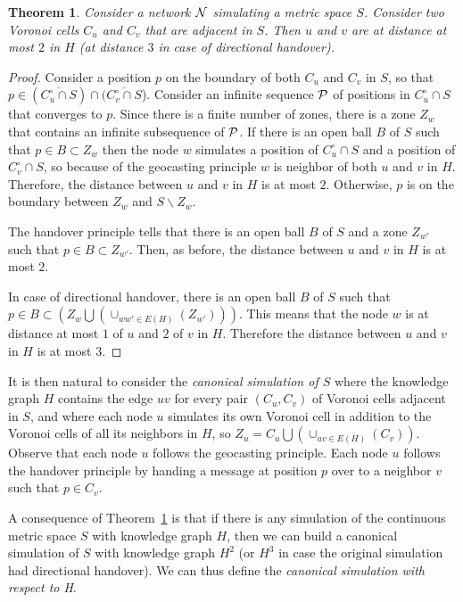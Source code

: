 \documentclass{article}
\newtheorem{theorem}{Theorem}
\begin{document}
\begin{theorem}
Consider a network $\cal N$ simulating a metric space $S$. Consider two Voronoi cells $C_u$ and $C_v$ that are adjacent in $S$. Then $u$ and $v$ are at distance at most $2$ in $H$ (at distance $3$ in case of directional handover).
\label{th_voronoi}
\end{theorem}

\begin{proof}
Consider a position $p$ on the boundary of both $C_u$ and $C_v$ in $S$, so that $p\in(\overline{C_u^\circ\cap S})\cap(\overline{C_v^\circ\cap S}$). Consider an infinite sequence $\cal P$ of positions in $C_u^\circ\cap S$ that converges to $p$. Since there is a finite number of zones, there is a zone $Z_w$ that contains an infinite subsequence of $\cal P$. 
If there is an open ball $B$ of $S$ such that $p\in B\subset Z_w$ then the node $w$ simulates a position of $C_u^\circ\cap S$ and a position of $C_v^\circ\cap S$, so because of the geocasting principle $w$ is neighbor of both $u$ and $v$ in $H$. Therefore, the distance between $u$ and $v$ in $H$ is at most $2$.
Otherwise, $p$ is on the boundary between $Z_w$ and $S\backslash Z_w$.

The handover principle tells that there is an open ball $B$ of $S$ and a zone $Z_{w'}$ such that $p\in B\subset Z_{w'}$. Then, as before, the distance between $u$ and $v$ in $H$ is at most $2$.

In case of directional handover, there is an open ball $B$ of $S$ such that $p\in B\subset(Z_w\bigcup (\cup_{ww'\in E(H)} (Z_{w'})))$. This means that the node $w$ is at distance at most $1$ of $u$ and $2$ of $v$ in $H$. Therefore the distance between $u$ and $v$ in $H$ is at most $3$.
\end{proof}

It is then natural to consider the {\em canonical simulation of $S$} where the knowledge graph $H$ contains the edge $uv$ for every pair  $(C_u,C_v)$ of Voronoi cells adjacent in $S$, and where each node $u$ simulates its own Voronoi cell in addition to the Voronoi cells of all its neighbors in $H$, so $Z_u = C_u\bigcup (\cup_{uv\in E(H)} (C_v))$. 
Observe that each node $u$ follows the geocasting principle. Each node $u$ follows the handover principle by handing a message at position $p$ over to a neighbor $v$ such that $p\in C_v$.

A consequence of Theorem~\ref{th_voronoi} is that if there is any simulation of the continuous metric space $S$ with knowledge graph $H$, then we can build a canonical simulation of $S$ with knowledge graph $H^2$ (or $H^3$ in case the original simulation had directional handover). We can thus define the {\em canonical simulation with respect to H}.
\end{document}
